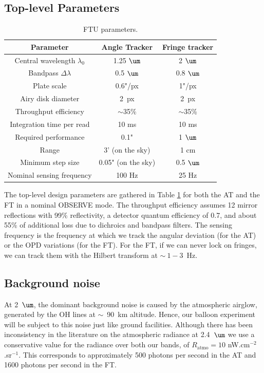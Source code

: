 \subsection{Top-level Parameters}
\begin{table}[!ht]
\begin{center}
\caption{FTU parameters. }
\label{tb:FTUparams}
\begin{tabular}{|c||c|c|}
\hline 
Parameter & Angle Tracker & Fringe tracker \\ 
\hline 
\hline
Central wavelength $\lambda_0$ & 1.25 $\um$ & 2 $\um$ \\ 
\hline 
Bandpass $\Delta\lambda$ & 0.5 $\um$ & 0.8 $\um$ \\ 
\hline 
Plate scale & 0.6"/px & 1"/px \\ 
\hline 
Airy disk diameter & 2~px & 2~px \\ 
\hline 
Throughput efficiency & $\sim$35\% & $\sim$35\% \\ 
\hline 
Integration time per read & 10 ms & 10 ms \\ 
\hline 
Required performance & 0.1" & 1 $\um$ \\ 
\hline 
Range & 3' (on the sky) & 1 cm \\ 
\hline 
Minimum step size & 0.05" (on the sky) & 0.5 $\um$ \\ 
\hline 
Nominal sensing frequency & 100 Hz & 25 Hz \\ 
\hline 
\end{tabular} 
\end{center}
\end{table}

The top-level design parameters are gathered in Table \ref{tb:FTUparams} for both the AT and the FT in a nominal OBSERVE mode.
The throughput efficiency assumes 12 mirror reflections with 99\% reflectivity, a detector quantum efficiency of 0.7, and about 55\% of additional loss due to dichroics and bandpass filters. The sensing frequency is the frequency at which we track the angular deviation (for the AT) or the OPD variations (for the FT). For the FT, if we can never lock on fringes, we can track them with the Hilbert transform at $\sim~1-3$~Hz.


\subsection{Background noise}\label{subsec:Noise}
At 2~$\um$, the dominant background noise is caused by the atmospheric airglow, generated by the OH lines at $\sim$~90~km altitude\cite{Hofmann:1977p2231}. Hence, our balloon experiment will be subject to this noise just like ground facilities. Although there has been inconsistency in the literature on the atmospheric radiance at 2.4~$\um$ \citep{Matsumoto:1994io,Mandolesi:1998wt} we use a conservative value for the radiance over both our bands, of $R_\textrm{atmo}=10$ nW.cm$^{-2}$.sr$^{-1}$. This corresponds to approximately 500 photons per second in the AT and 1600 photons per second in the FT. 


